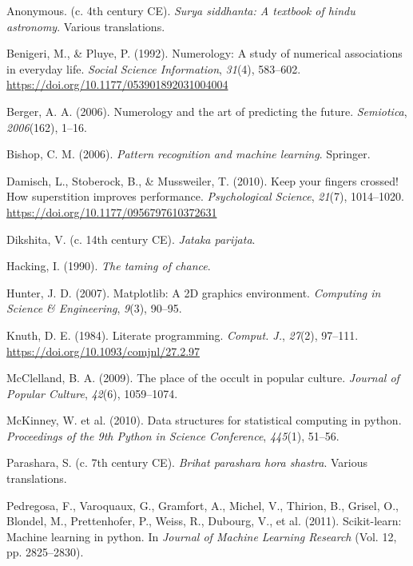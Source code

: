 \documentclass[
  american,
  11pt,
  oneside,
  openany]{article}
\newlength{\cslhangindent}
\newenvironment{CSLReferences}[2] %
 {\begin{list}{}{%
  \setlength{\itemindent}{0pt}
  \setlength{\leftmargin}{0pt}
  \setlength{\parsep}{0pt}
  \ifodd #1
   \setlength{\leftmargin}{\cslhangindent}
   \setlength{\itemindent}{-1\cslhangindent}
  \fi
  \setlength{\itemsep}{#2\baselineskip}}}
 {\end{list}}
\begin{document}
\label{refs}
\begin{CSLReferences}{1}{0}
Anonymous. (c. 4th century CE). \emph{Surya siddhanta: A textbook of
hindu astronomy}. Various translations.

Benigeri, M., \& Pluye, P. (1992). Numerology: A study of numerical
associations in everyday life. \emph{Social Science Information},
\emph{31}(4), 583--602. \url{https://doi.org/10.1177/053901892031004004}

Berger, A. A. (2006). Numerology and the art of predicting the future.
\emph{Semiotica}, \emph{2006}(162), 1--16.

Bishop, C. M. (2006). \emph{Pattern recognition and machine learning}.
Springer.

Damisch, L., Stoberock, B., \& Mussweiler, T. (2010). Keep your fingers
crossed! How superstition improves performance. \emph{Psychological
Science}, \emph{21}(7), 1014--1020.
\url{https://doi.org/10.1177/0956797610372631}

Dikshita, V. (c. 14th century CE). \emph{Jataka parijata}.

Hacking, I. (1990). \emph{The taming of chance}.

Hunter, J. D. (2007). Matplotlib: A 2D graphics environment.
\emph{Computing in Science \& Engineering}, \emph{9}(3), 90--95.

Knuth, D. E. (1984). Literate programming. \emph{Comput. J.},
\emph{27}(2), 97--111. \url{https://doi.org/10.1093/comjnl/27.2.97}

McClelland, B. A. (2009). The place of the occult in popular culture.
\emph{Journal of Popular Culture}, \emph{42}(6), 1059--1074.

McKinney, W. et al. (2010). Data structures for statistical computing in
python. \emph{Proceedings of the 9th Python in Science Conference},
\emph{445}(1), 51--56.

Parashara, S. (c. 7th century CE). \emph{Brihat parashara hora shastra}.
Various translations.

Pedregosa, F., Varoquaux, G., Gramfort, A., Michel, V., Thirion, B.,
Grisel, O., Blondel, M., Prettenhofer, P., Weiss, R., Dubourg, V., et
al. (2011). Scikit-learn: Machine learning in python. In \emph{Journal
of Machine Learning Research} (Vol. 12, pp. 2825--2830).


\end{CSLReferences}
\end{document}
